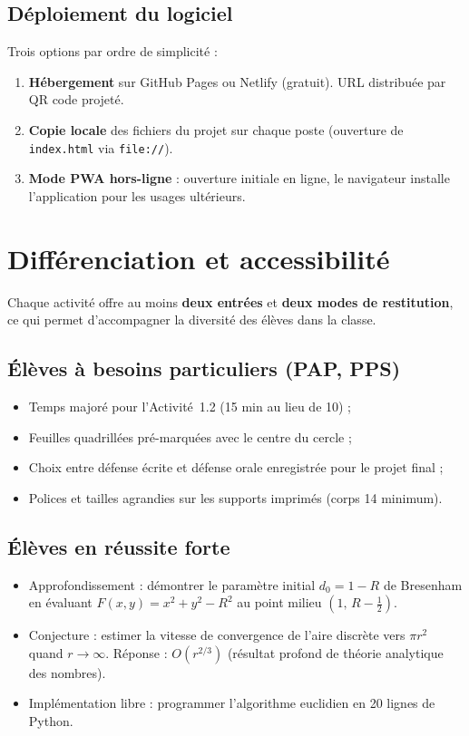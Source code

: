 \documentclass[12pt,a4paper]{scrartcl}
\newcommand{\acc}[1]{\textcolor{accent}{\textbf{#1}}}
\begin{document}
\subsection{Déploiement du logiciel}

Trois options par ordre de simplicité :

\begin{enumerate}[leftmargin=1.5em,itemsep=0.15em,topsep=0.3em]
  \item \textbf{Hébergement} sur GitHub Pages ou Netlify (gratuit). URL distribuée par QR code projeté.
  \item \textbf{Copie locale} des fichiers du projet sur chaque poste (ouverture de \texttt{index.html} via \texttt{file://}).
  \item \textbf{Mode PWA hors-ligne} : ouverture initiale en ligne, le navigateur installe l'application pour les usages ultérieurs.
\end{enumerate}

\section{Différenciation et accessibilité}\label{sec:diff}

Chaque activité offre au moins \acc{deux entrées} et \acc{deux modes de restitution}, ce qui permet d'accompagner la diversité des élèves dans la classe.

\subsection{Élèves à besoins particuliers (PAP, PPS)}
\begin{itemize}[leftmargin=1.3em,itemsep=0.15em,topsep=0.3em]
  \item Temps majoré pour l'Activité~1.2 (15 min au lieu de 10) ;
  \item Feuilles quadrillées pré-marquées avec le centre du cercle ;
  \item Choix entre défense écrite et défense orale enregistrée pour le projet final ;
  \item Polices et tailles agrandies sur les supports imprimés (corps 14 minimum).
\end{itemize}

\subsection{Élèves en réussite forte}
\begin{itemize}[leftmargin=1.3em,itemsep=0.15em,topsep=0.3em]
  \item Approfondissement : démontrer le paramètre initial $d_0 = 1 - R$ de Bresenham en évaluant $F(x, y) = x^2 + y^2 - R^2$ au point milieu $(1,\, R - \tfrac{1}{2})$.
  \item Conjecture : estimer la vitesse de convergence de l'aire discrète vers $\pi r^2$ quand $r \to \infty$. Réponse : $O(r^{2/3})$ (résultat profond de théorie analytique des nombres).
  \item Implémentation libre : programmer l'algorithme euclidien en 20 lignes de Python.
\end{itemize}
\end{document}
